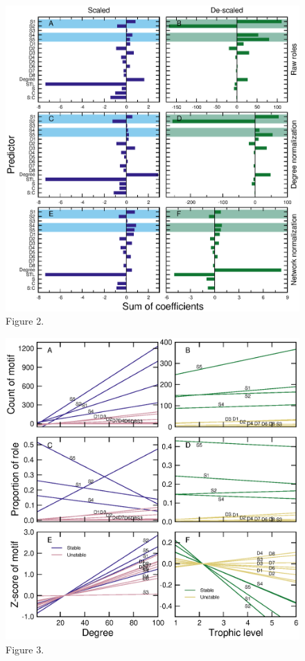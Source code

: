 \documentclass[12pt]{article}
\begin{document}
    \clearpage

	\begin{figure}[h!]
		\caption{Figure 2.}
        \label{coefficient_sum}
        \includegraphics[height=0.6\textheight]{figures/PLS/total_coefficients.eps}
        \end{figure}

    \clearpage
    
	\begin{figure}[h!]
		\caption{Figure 3.}
        \label{motif_vs_degTL}
        \includegraphics[height=.65\textheight]{figures/roles/motif_vs_oneD.eps}
		\end{figure}
\end{document}
